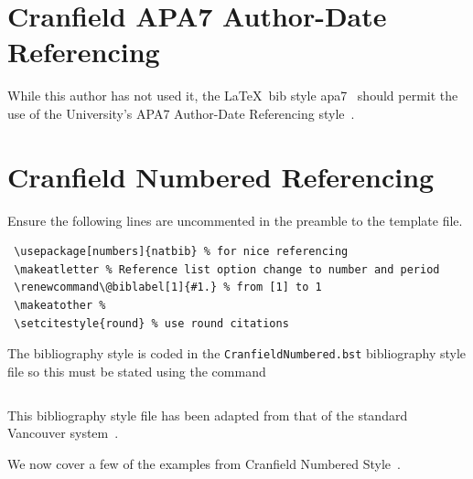 \documentclass[12pt,oneside]{book} %
\makeatletter
\renewcommand\@biblabel[1]{#1.} %
\makeatother
\begin{document}
\section{Cranfield APA7 Author-Date Referencing}
\label{sec:authordaterefs}
While this author has not used it, the \LaTeX\ bib style apa7~\cite{weiss_ctan_2022} should permit the use of the University's APA7 Author-Date Referencing style~\cite{cranfield_library_service_apa7_2021}.


\section{Cranfield Numbered Referencing} 
\label{sec:CranfieldNumbered}
Ensure the following lines are uncommented in the preamble to the template file. 
\begin{verbatim}
 \usepackage[numbers]{natbib} % for nice referencing
 \makeatletter % Reference list option change to number and period
 \renewcommand\@biblabel[1]{#1.} % from [1] to 1
 \makeatother %
 \setcitestyle{round} % use round citations
 \end{verbatim}
The bibliography style is coded in the \verb#CranfieldNumbered.bst# bibliography style file so this must be stated using the \verb## command
\begin{verbatim}

\end{verbatim}
This bibliography style file  has been adapted from that of the standard Vancouver system~\cite{van_der_beek_ctan_2021}.

We now cover a few of the examples from Cranfield Numbered Style~\cite{barrington_library_numbered_2016}. 
\end{document}
